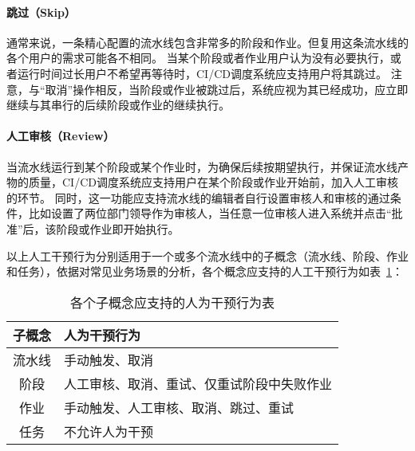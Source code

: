 \paragraph{跳过（Skip）}
通常来说，一条精心配置的流水线包含非常多的阶段和作业。但复用这条流水线的各个用户的需求可能各不相同。
当某个阶段或者作业用户认为没有必要执行，或者运行时间过长用户不希望再等待时，CI/CD调度系统应支持用户将其跳过。
注意，与“取消”操作相反，当阶段或作业被跳过后，系统应视为其已经成功，应立即继续与其串行的后续阶段或作业的继续执行。

\paragraph{人工审核（Review）}
当流水线运行到某个阶段或某个作业时，为确保后续按期望执行，并保证流水线产物的质量，CI/CD调度系统应支持用户在某个阶段或作业开始前，加入人工审核的环节。
同时，这一功能应支持流水线的编辑者自行设置审核人和审核的通过条件，比如设置了两位部门领导作为审核人，当任意一位审核人进入系统并点击“批准”后，该阶段或作业即开始执行。

以上人工干预行为分别适用于一个或多个流水线中的子概念（流水线、阶段、作业和任务），依据对常见业务场景的分析，各个概念应支持的人工干预行为如表~\ref{tab:各个子概念应支持的人为干预行为表}：
\begin{table}[h]
  \centering
  \caption{各个子概念应支持的人为干预行为表}
  \label{tab:各个子概念应支持的人为干预行为表}
  \begin{tabular}{cl}
    \toprule
    子概念   & 人为干预行为                                     \\
    \midrule
    流水线 & 手动触发、取消 \\
    阶段      & 人工审核、取消、重试、仅重试阶段中失败作业   \\
    作业      & 手动触发、人工审核、取消、跳过、重试      \\
    任务       & 不允许人为干预       \\
    \bottomrule
  \end{tabular}
\end{table}

